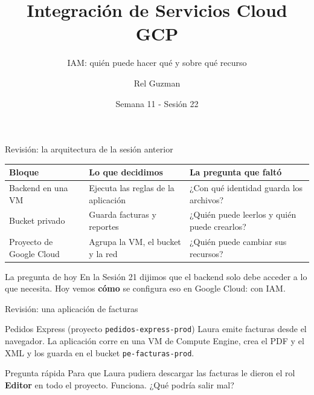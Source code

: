 \documentclass[aspectratio=169,10pt,c]{beamer}
\title{Integración de Servicios Cloud GCP}
\subtitle{IAM: quién puede hacer qué y sobre qué recurso}
\date{Semana 11 - Sesión 22}
\author{Rel Guzman}
\begin{document}
{\maketitle}

\begin{frame}{Revisión: la arquitectura de la sesión anterior}
\renewcommand{\arraystretch}{1.28}
\centering\small
\begin{tabular}{@{}p{3.0cm}p{4.9cm}p{5.1cm}@{}}
\toprule
\textbf{Bloque} & \textbf{Lo que decidimos} & \textbf{La pregunta que faltó}\\
\midrule
Backend en una VM & Ejecuta las reglas de la aplicación & ¿Con qué identidad guarda los archivos?\\
Bucket privado & Guarda facturas y reportes & ¿Quién puede leerlos y quién puede crearlos?\\
Proyecto de Google Cloud & Agrupa la VM, el bucket y la red & ¿Quién puede cambiar sus recursos?\\
\bottomrule
\end{tabular}
\par\vspace{3mm}
\begin{alertblock}{La pregunta de hoy}
\small En la Sesión 21 dijimos que el backend solo debe acceder a lo que necesita. Hoy vemos \textbf{cómo} se configura eso en Google Cloud: con IAM.
\end{alertblock}
\end{frame}

\begin{frame}{Revisión: una aplicación de facturas}
\begin{block}{Pedidos Express (proyecto \texttt{pedidos-express-prod})}
\small Laura emite facturas desde el navegador. La aplicación corre en una VM de Compute Engine, crea el PDF y el XML y los guarda en el bucket \texttt{pe-facturas-prod}.
\end{block}
\begin{center}
\end{center}
\begin{alertblock}{Pregunta rápida}
\small Para que Laura pudiera descargar las facturas le dieron el rol \textbf{Editor} en todo el proyecto. Funciona. ¿Qué podría salir mal?
\end{alertblock}
\end{frame}
\end{document}
